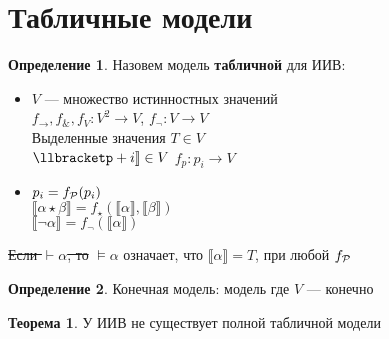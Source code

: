 \documentclass[oneside]{book}
\theoremstyle{plain}
\theoremstyle{remark}
\theoremstyle{definition}
\newtheorem{theorem}{Теорема}[section]
\newtheorem*{definition}{Определение}
\begin{document}
\section{Табличные модели}
\label{sec:org1d94bb0}
\begin{definition}
Назовем модель \textbf{табличной} для ИИВ:
\begin{itemize}
\item \(V\) --- множество истинностных значений \\
\(f_\to,f_\&, f_V: V^2 \to V\), \(f_\neg: V \to V\) \\
Выделенные значения \(T \in V\) \\
\(\llbracketp+i\rrbracket \in V\) \(f_p : p_i \to V\)
\item \(p_i = f_\P(p_i)\) \\
\(\llbracket\alpha \star \beta\rrbracket = f_\star(\llbracket\alpha\rrbracket, \llbracket\beta\rrbracket)\) \\
\(\llbracket\neg \alpha\rrbracket = f_\neg(\llbracket\alpha\rrbracket)\)
\end{itemize}
\sout{Если \(\vdash \alpha\), то} \(\vDash \alpha\) означает, что \(\llbracket\alpha\rrbracket = T\), при любой \(f_\P\)
\end{definition}
\begin{definition}
Конечная модель: модель где \(V\) --- конечно
\end{definition}
\begin{theorem}
У ИИВ не существует полной табличной модели
\end{theorem}
\end{document}
